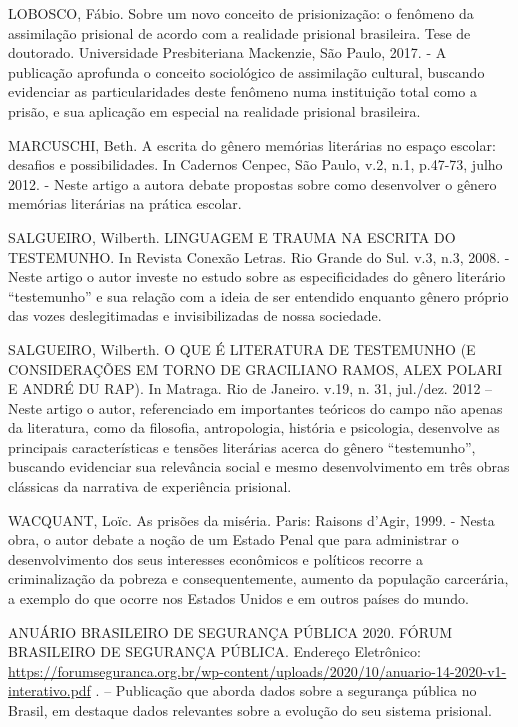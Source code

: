 \documentclass[11pt]{extarticle}
\begin{document}
LOBOSCO, Fábio. Sobre um novo conceito de prisionização: o fenômeno da
assimilação prisional de acordo com a realidade prisional brasileira.
Tese de doutorado. Universidade Presbiteriana Mackenzie, São Paulo,
2017. - A publicação aprofunda o conceito sociológico de assimilação
cultural, buscando evidenciar as particularidades deste fenômeno numa
instituição total como a prisão, e sua aplicação em especial na
realidade prisional brasileira.

MARCUSCHI, Beth. A escrita do gênero memórias literárias no espaço
escolar: desafios e possibilidades. In Cadernos Cenpec, São Paulo, v.2,
n.1, p.47-73, julho 2012. - Neste artigo a autora debate propostas sobre
como desenvolver o gênero memórias literárias na prática escolar.

SALGUEIRO, Wilberth. LINGUAGEM E TRAUMA NA ESCRITA DO TESTEMUNHO. In
Revista Conexão Letras. Rio Grande do Sul. v.3, n.3, 2008. - Neste
artigo o autor investe no estudo sobre as especificidades do gênero
literário ``testemunho'' e sua relação com a ideia de ser entendido
enquanto gênero próprio das vozes deslegitimadas e invisibilizadas de
nossa sociedade.

SALGUEIRO, Wilberth. O QUE É LITERATURA DE TESTEMUNHO (E CONSIDERAÇÕES
EM TORNO DE GRACILIANO RAMOS, ALEX POLARI E ANDRÉ DU RAP). In Matraga.
Rio de Janeiro. v.19, n. 31, jul./dez. 2012 -- Neste artigo o autor,
referenciado em importantes teóricos do campo não apenas da literatura,
como da filosofia, antropologia, história e psicologia, desenvolve as
principais características e tensões literárias acerca do gênero
``testemunho'', buscando evidenciar sua relevância social e mesmo
desenvolvimento em três obras clássicas da narrativa de experiência
prisional.

WACQUANT, Loïc. As prisões da miséria\emph{.} Paris: Raisons d'Agir,
1999. - Nesta obra, o autor debate a noção de um Estado Penal que para
administrar o desenvolvimento dos seus interesses econômicos e políticos
recorre a criminalização da pobreza e consequentemente, aumento da
população carcerária, a exemplo do que ocorre nos Estados Unidos e em
outros países do mundo.

ANUÁRIO BRASILEIRO DE SEGURANÇA PÚBLICA 2020. FÓRUM BRASILEIRO DE
SEGURANÇA PÚBLICA. Endereço Eletrônico:
\url{https://forumseguranca.org.br/wp-content/uploads/2020/10/anuario-14-2020-v1-interativo.pdf}
. -- Publicação que aborda dados sobre a segurança pública no Brasil, em
destaque dados relevantes sobre a evolução do seu sistema prisional.
\end{document}

